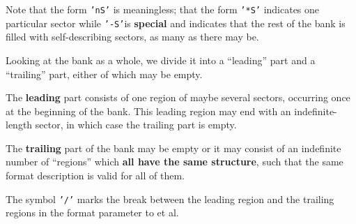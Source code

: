 Note that the form {\tt 'nS'} is meaningless;
that the form {\tt '*S'}
indicates one particular sector while
{\tt '-S'}is {\bf special} and
indicates that the rest of the bank is filled
with self-describing sectors,
as many as there may be.
\par Looking at the bank as a whole,
we divide it into a ``leading'' part and a ``trailing'' part,
either of which may be empty.
\par The {\bf leading}
part consists of one region of maybe several sectors,
occurring once at the beginning of the bank.
This leading region may end with an indefinite-length sector,
in which case the trailing part is empty.
\par The {\bf trailing} part of the bank may be empty or it may consist
of an indefinite number of ``regions'' which
{\bf all have the same structure},
such that the same format description is valid for all of them.
\par
The symbol {\tt '/'} marks the break between the leading region
and the trailing regions in the format parameter to  et al.
